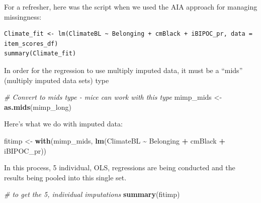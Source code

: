 \documentclass[
  11pt,
]{book}
\newenvironment{Shaded}{\begin{snugshade}}{\end{snugshade}}
\newcommand{\CommentTok}[1]{\textcolor[rgb]{0.37,0.37,0.37}{\textit{#1}}}
\newcommand{\FunctionTok}[1]{\textcolor[rgb]{0.27,0.27,0.27}{\textbf{#1}}}
\newcommand{\NormalTok}[1]{#1}
\newcommand{\OtherTok}[1]{\textcolor[rgb]{0.37,0.37,0.37}{#1}}
\newcommand{\SpecialCharTok}[1]{\textcolor[rgb]{0.43,0.43,0.43}{\textbf{#1}}}
\begin{document}
For a refresher, here was the script when we used the AIA approach for managing missingness:

\begin{verbatim}
Climate_fit <- lm(ClimateBL ~ Belonging + cmBlack + iBIPOC_pr, data = item_scores_df)
summary(Climate_fit)
\end{verbatim}

In order for the regression to use multiply imputed data, it must be a ``mids'' (multiply imputed data sets) type

\begin{Shaded}
\begin{Highlighting}[]
\CommentTok{\# Convert to mids type {-} mice can work with this type}
\NormalTok{mimp\_mids }\OtherTok{\textless{}{-}} \FunctionTok{as.mids}\NormalTok{(mimp\_long)}
\end{Highlighting}
\end{Shaded}

Here's what we do with imputed data:

\begin{Shaded}
\begin{Highlighting}[]
\NormalTok{fitimp }\OtherTok{\textless{}{-}} \FunctionTok{with}\NormalTok{(mimp\_mids, }\FunctionTok{lm}\NormalTok{(ClimateBL }\SpecialCharTok{\textasciitilde{}}\NormalTok{ Belonging }\SpecialCharTok{+}\NormalTok{ cmBlack }\SpecialCharTok{+}\NormalTok{ iBIPOC\_pr))}
\end{Highlighting}
\end{Shaded}

In this process, 5 individual, OLS, regressions are being conducted and the results being pooled into this single set.

\begin{Shaded}
\begin{Highlighting}[]
\CommentTok{\# to get the 5, individual imputations}
\FunctionTok{summary}\NormalTok{(fitimp)}
\end{Highlighting}
\end{Shaded}
\end{document}
